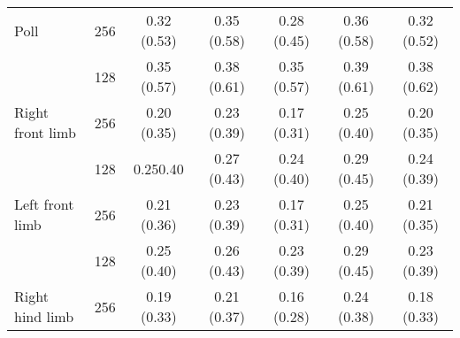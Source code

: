 \begin{table}[htbp]
{\begin{tabular}[H]{lcccccc}
    \multicolumn{1}{l}{Poll} &\multicolumn{1}{c}{256} & \multicolumn{1}{c}{\cellcolor{red!35}0.32 (0.53)} & \multicolumn{1}{c}{\cellcolor{red!40}0.35 (0.58)}  & \multicolumn{1}{c}{\cellcolor{red!35}0.28 (0.45)}  & \multicolumn{1}{c}{\cellcolor{red!45}0.36 (0.58)}  & \multicolumn{1}{c}{{\cellcolor{red!35}0.32 (0.52)}}\\
    
    &\multicolumn{1}{c}{128}& \multicolumn{1}{c}{\cellcolor{red!40}0.35 (0.57)} &  \multicolumn{1}{c}{\cellcolor{red!50}0.38 (0.61)} &  \multicolumn{1}{c}{\cellcolor{red!40}0.35 (0.57)} &  \multicolumn{1}{c}{\cellcolor{red!50}0.39 (0.61)} &  \multicolumn{1}{c}{{\cellcolor{red!50}0.38 (0.62)}} \\

    \multicolumn{1}{l}{Right front limb} &\multicolumn{1}{c}{256} & \multicolumn{1}{c}{\cellcolor{blue!13}0.20 (0.35)}  & \multicolumn{1}{c}{\cellcolor{red!10}0.23 (0.39)}  & \multicolumn{1}{c}{\cellcolor{blue!35}0.17 (0.31)}  & \multicolumn{1}{c}{\cellcolor{red!15}0.25 (0.40)}  & \multicolumn{1}{c}{{\cellcolor{blue!13}0.20 (0.35)}} \\ 
    
     &\multicolumn{1}{c}{128}& \multicolumn{1}{c}{\cellcolor{red!15}0.250.40} &  \multicolumn{1}{c}{\cellcolor{red!22}0.27 (0.43)} &  \multicolumn{1}{c}{\cellcolor{red!10}0.24 (0.40)} &  \multicolumn{1}{c}{\cellcolor{red!28}0.29 (0.45)} &  \multicolumn{1}{c}{{\cellcolor{red!10}0.24 (0.39)}} \\
 
    \multicolumn{1}{l}{Left front limb} &\multicolumn{1}{c}{256} & \multicolumn{1}{c}{\cellcolor{blue!10}0.21 (0.36)} &  \multicolumn{1}{c}{\cellcolor{red!10}0.23 (0.39)} &  \multicolumn{1}{c}{\cellcolor{blue!35}0.17 (0.31)} &  \multicolumn{1}{c}{\cellcolor{red!15}0.25 (0.40)} &  \multicolumn{1}{c}{{\cellcolor{blue!10}0.21 (0.35)}} \\
    
    &\multicolumn{1}{c}{128}& \multicolumn{1}{c}{\cellcolor{red!15}0.25 (0.40)} &  \multicolumn{1}{c}{\cellcolor{red!20}0.26 (0.43)} &  \multicolumn{1}{c}{\cellcolor{red!10}0.23 (0.39)} &  \multicolumn{1}{c}{\cellcolor{red!28}0.29 (0.45)} &  \multicolumn{1}{c}{{\cellcolor{red!10}0.23 (0.39)}} \\

    \multicolumn{1}{l}{Right hind limb} &\multicolumn{1}{c}{256} & \multicolumn{1}{c}{\cellcolor{blue!18}0.19 (0.33)} &  \multicolumn{1}{c}{\cellcolor{blue!10}0.21 (0.37)} & \multicolumn{1}{c}{\cellcolor{blue!40}0.16 (0.28)} & \multicolumn{1}{c}{\cellcolor{red!10}0.24 (0.38)} &  \multicolumn{1}{c}{{\cellcolor{blue!25}0.18 (0.33)}}\\ 
    

\end{tabular}}
\end{table}
